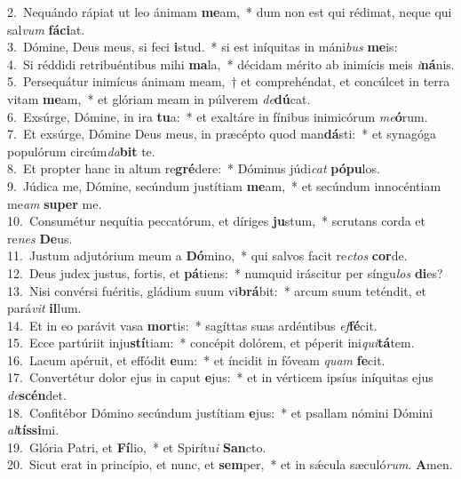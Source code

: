 {2.~}Nequándo rápiat ut leo ánimam \textbf{me}am,~* dum non est qui rédimat, neque qui sal\textit{vum} \textbf{fá}\textbf{ci}at.\\
{3.~}Dómine, Deus meus, si feci \textbf{i}stud.~* si est iníquitas in máni\textit{bus} \textbf{me}is:\\
{4.~}Si réddidi retribuéntibus mihi \textbf{ma}la,~* décidam mérito ab inimícis meis \textit{i}\textbf{ná}nis.\\
{5.~}Persequátur inimícus ánimam meam,~† et comprehéndat, et concúlcet in terra vitam \textbf{me}am,~* et glóriam meam in púlverem \textit{de}\textbf{dú}cat.\\
{6.~}Exsúrge, Dómine, in ira \textbf{tu}a:~* et exaltáre in fínibus inimicórum \textit{me}\textbf{ó}rum.\\
{7.~}Et exsúrge, Dómine Deus meus, in præcépto quod man\textbf{dá}sti:~* et synagóga populórum circúm\textit{da}\textbf{bit} te.\\
{8.~}Et propter hanc in altum re\textbf{gré}dere:~* Dóminus júdi\textit{cat} \textbf{pó}\textbf{pu}los.\\
{9.~}Júdica me, Dómine, secúndum justítiam \textbf{me}am,~* et secúndum innocéntiam me\textit{am} \textbf{su}\textbf{per} me.\\
{10.~}Consumétur nequítia peccatórum, et díriges \textbf{ju}stum,~* scrutans corda et re\textit{nes} \textbf{De}us.\\
{11.~}Justum adjutórium meum a \textbf{Dó}mino,~* qui salvos facit re\textit{ctos} \textbf{cor}de.\\
{12.~}Deus judex justus, fortis, et \textbf{pá}tiens:~* numquid iráscitur per síngu\textit{los} \textbf{di}es?\\
{13.~}Nisi convérsi fuéritis, gládium suum vi\textbf{brá}bit:~* arcum suum teténdit, et pará\textit{vit} \textbf{il}lum.\\
{14.~}Et in eo parávit vasa \textbf{mor}tis:~* sagíttas suas ardéntibus \textit{ef}\textbf{fé}cit.\\
{15.~}Ecce partúriit inju\textbf{stí}tiam:~* concépit dolórem, et péperit ini\textit{qui}\textbf{tá}tem.\\
{16.~}Lacum apéruit, et effódit \textbf{e}um:~* et íncidit in fóveam \textit{quam} \textbf{fe}cit.\\
{17.~}Convertétur dolor ejus in caput \textbf{e}jus:~* et in vérticem ipsíus iníquitas ejus \textit{de}\textbf{scén}det.\\
{18.~}Confitébor Dómino secúndum justítiam \textbf{e}jus:~* et psallam nómini Dómini \textit{al}\textbf{tís}\textbf{si}mi.\\
{19.~}Glória Patri, et \textbf{Fí}lio,~* et Spirítu\textit{i} \textbf{San}cto.\\
{20.~}Sicut erat in princípio, et nunc, et \textbf{sem}per,~* et in sǽcula sæculó\textit{rum}. \textbf{A}men.\\

